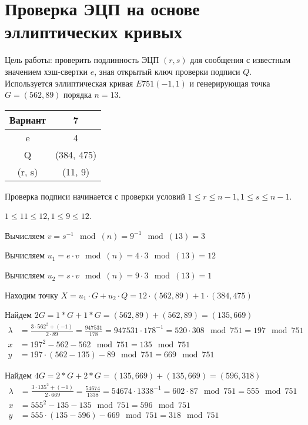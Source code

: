 \section{Проверка ЭЦП на основе эллиптических кривых}

Цель работы: проверить подлинность ЭЦП $(r,s)$ для сообщения с известным значением хэш-свертки $e$, зная открытый ключ проверки подписи $Q$. Используется эллиптическая кривая $E751(−1,1)$ и генерирующая точка $G = (562, 89)$ порядка $n = 13$.

\begin{table}[H]
	\centering
	\begin{tabular}{|c|c|}
		\hline 
		Вариант & 7 \\ 
		\hline 
		e & 4 \\ 
		\hline 
		Q & (384, 475) \\ 
		\hline 
		(r, s) & (11, 9) \\ 
		\hline 
	\end{tabular} 
\end{table}


Проверка подписи начинается с проверки условий $ 1 \leq r \leq n−1, 1 \leq s \leq n−1 $.

$1 \leq 11 \leq 12, 1 \leq 9 \leq 12$.	


Вычисляем $v = s^{-1} \mod(n) = 9^{-1} \mod(13) = 3$

Вычисляем $u_1 = e \cdot v \mod(n) = 4 \cdot 3 \mod(13) = 12$

Вычисляем $u_2 = s \cdot v \mod(n) = 9 \cdot 3 \mod(13) = 1$

Находим точку $X=u_1\cdot G+u_2 \cdot Q = 12 \cdot (562, 89) + 1 \cdot (384, 475)$

 Найдем $2G = 1*G+1*G=(562, 89) + (562, 89) = (135, 669)$
\begin{equation*}
	\begin{aligned}
		\lambda &= \frac{ 3 \cdot 562^2 + (-1) }{2 \cdot 89} = \frac{947531}{178} = 947531 \cdot 178^{-1} = 520 \cdot 308\mod{751} = 197\mod{751} \\
		x &= 197^2 - 562 - 562 \mod{751} = 135\mod{751} \\
		y &= 197 \cdot (562 - 135) - 89\mod{751} = 669\mod{751}
	\end{aligned}
\end{equation*}

Найдем $4G = 2*G+2*G=(135, 669) + (135, 669) = (596, 318)$
\begin{equation*}
	\begin{aligned}
		\lambda &= \frac{ 3 \cdot 135^2 + (-1) }{2 \cdot 669} = \frac{54674}{1338} = 54674 \cdot 1338^{-1} = 602 \cdot 87\mod{751} = 555\mod{751} \\
		x &= 555^2 - 135 - 135 \mod{751} = 596\mod{751} \\
		y &= 555 \cdot (135 - 596) - 669\mod{751} = 318\mod{751}
	\end{aligned}
\end{equation*}

